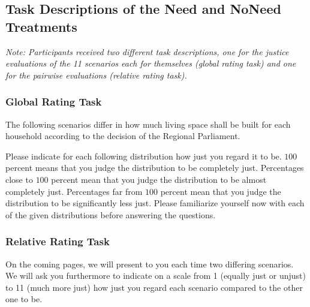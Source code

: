 \documentclass[12pt]{scrartcl}
\begin{document}
\subsection*{Task Descriptions of the Need and NoNeed Treatments}
\textit{Note: Participants received two different task descriptions, one for the justice evaluations of the 11 scenarios each for themselves (global rating task) and one for the pairwise evaluations (relative rating task).}

\subsubsection*{Global Rating Task}
The following scenarios differ in how much living space shall be built for each household according to the decision of the Regional Parliament.

Please indicate for each following distribution how just you regard it to be.
$100$ percent means that you judge the distribution to be completely just.
Percentages close to $100$ percent mean that you judge the distribution to be almost completely just.
Percentages far from $100$ percent mean that you judge the distribution to be significantly
less just.
Please familiarize yourself now with each of the given distributions before answering the questions.

\subsubsection*{Relative Rating Task}
On the coming pages, we will present to you each time two differing scenarios.
We will ask you furthermore to indicate on a scale from 1 (equally just or unjust) to 11 (much more just) how just you regard each scenario compared to the other one to be.
\end{document}
